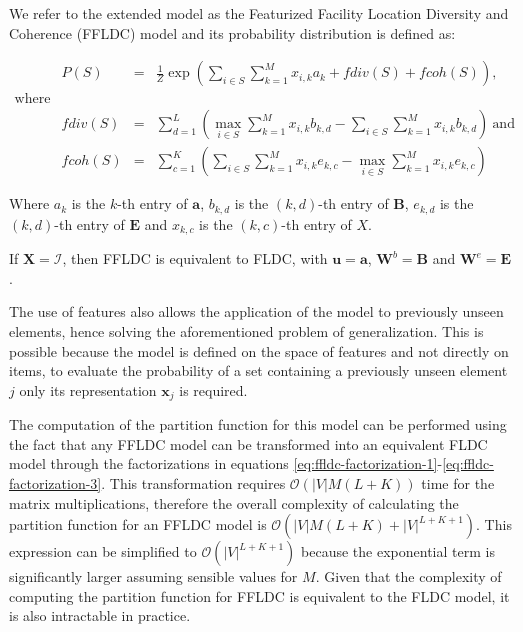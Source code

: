 We refer to the extended model as the Featurized Facility Location Diversity and Coherence (FFLDC) model and its probability distribution is defined as:

\begin{align}
  \tag{FFLDC} \label{eq:ffldc}
  & P(S) &=& \frac{1}{Z}\exp{\left(\sum_{i \in S}{\sum_{k=1}^{M}x_{i,k}a_{k}} + fdiv(S) + fcoh(S)\right)}, \\
  \text{where} & & \\
  & fdiv(S) &=& \sum_{d=1}^{L}{\left(\max_{i \in S}{\sum_{k=1}^{M}x_{i,k}b_{k,d}} - \sum_{i \in S}{\sum_{k=1}^{M}x_{i,k}b_{k,d}}\right)}\ \text{and} \\
  & fcoh(S) &=& \sum_{c=1}^{K}{\left(\sum_{i \in S}{\sum_{k=1}^{M}x_{i,k}e_{k,c}} - \max_{i \in S}{\sum_{k=1}^{M}x_{i,k}e_{k,c}}\right)}
\end{align}

Where $a_{k}$ is the $k$-th entry of $\mathbf{a}$, $b_{k,d}$ is the $(k,d)$-th entry of $\mathbf{B}$, $e_{k,d}$ is the $(k,d)$-th entry of $\mathbf{E}$ and $x_{k,c}$ is the $(k,c)$-th entry of $X$.

\begin{remark}
  If $\mathbf{X} = \mathcal{I}$, then FFLDC is equivalent to FLDC, with $\mathbf{u} = \mathbf{a}$, $\mathbf{W}^{b} = \mathbf{B}$ and $\mathbf{W}^{e} = \mathbf{E}$.
\end{remark}

The use of features also allows the application of the model to previously unseen elements, hence solving the aforementioned problem of generalization. This is possible because the model is defined on the space of features and not directly on items, to evaluate the probability of a set containing a previously unseen element $j$ only its representation $\mathbf{x}_{j}$ is required.

The computation of the partition function for this model can be performed using the fact that any FFLDC model can be transformed into an equivalent FLDC model through the factorizations in equations \eqref{eq:ffldc-factorization-1}-\eqref{eq:ffldc-factorization-3}. This transformation requires $\mathcal{O}(|V|M(L+K))$ time for the matrix multiplications, therefore the overall complexity of calculating the partition function for an FFLDC model is $\mathcal{O}(|V|M(L+K) + |V|^{L+K+1})$. This expression can be simplified to $\mathcal{O}(|V|^{L+K+1})$ because the exponential term is significantly larger assuming sensible values for $M$. Given that the complexity of computing the partition function for FFLDC is equivalent to the FLDC model, it is also intractable in practice.

